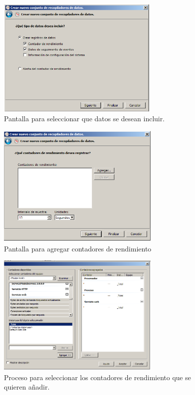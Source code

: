 \begin{figure}[H]
  \begin{center}
    \includegraphics[width=0.7\textwidth]{imagenes/rec3}
    \caption{Pantalla para seleccionar que datos se desean incluir.}
    \label{fig7}
  \end{center}
\end{figure}

\begin{figure}[H]
  \begin{center}
    \includegraphics[width=0.7\textwidth]{imagenes/rec3_5}
    \caption{Pantalla para agregar contadores de rendimiento}
    \label{fig8}
  \end{center}
\end{figure}

\begin{figure}[H]
  \begin{center}
    \includegraphics[width=0.7\textwidth]{imagenes/rec4}
    \caption{Proceso para seleccionar los contadores de rendimiento que se quieren añadir.}
    \label{fig9}
  \end{center}
\end{figure}

